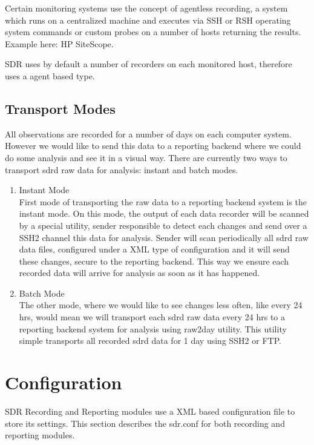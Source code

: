 Certain monitoring systems use the concept of agentless recording, 
a system which runs on a centralized machine and executes via 
SSH or RSH operating system commands or custom probes on a number 
of hosts returning the results. Example here: HP SiteScope.

SDR uses by default a number of recorders on each monitored host,
therefore uses a agent based type. 

\subsection*{Transport Modes}
All observations are recorded for a number of days on each computer system. 
However we would like to send this data to a reporting backend where we could 
do some analysis and see it in a visual way. There are currently two ways 
to transport sdrd raw data for analysis: instant and batch modes.

\begin{enumerate}
\item Instant Mode\\
First mode of transporting the raw data to a reporting backend system 
is the instant mode. On this mode, the output of each data recorder will be 
scanned by a special utility, sender responsible to detect each changes 
and send over a SSH2 channel this data for analysis. Sender will scan 
periodically all sdrd raw data files, configured under a XML type of 
configuration and it will send these changes, secure to the reporting 
backend. This way we ensure each recorded data will arrive for analysis 
as soon as it has happened.

\item Batch Mode\\
The other mode, where we would like to see changes less often, like every 
24 hrs, would mean we will transport each sdrd raw data every 24 hrs to 
a reporting backend system for analysis using raw2day utility. This 
utility simple transports all recorded sdrd data for 1 day using SSH2 or FTP.
\end{enumerate}


\section{Configuration}
SDR Recording and Reporting modules use a XML based configuration
file to store its settings. This section describes the sdr.conf
for both recording and reporting modules.

